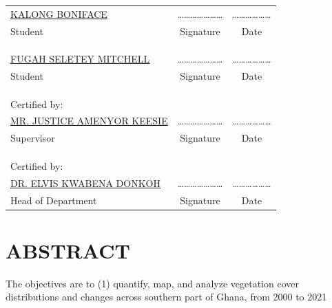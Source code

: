 \documentclass[12pt,a4paper]{book}
\begin{document}
	\begin{center}
	\begin{tabular}{lcc}
		\underline{KALONG BONIFACE} &\quad\quad\quad \ldots\ldots\ldots\ldots\ldots\ldots\ldots &\quad\quad\quad \ldots\ldots\ldots\ldots\ldots\ldots \\
		Student &\quad\quad\quad Signature &\quad\quad\quad Date \\
		& & \\
		& & \\
		& & \\
		\underline{FUGAH SELETEY MITCHELL} &\quad\quad\quad \ldots\ldots\ldots\ldots\ldots\ldots\ldots &\quad\quad\quad \ldots\ldots\ldots\ldots\ldots\ldots \\
		Student &\quad\quad\quad Signature &\quad\quad\quad Date \\
		& & \\
		& & \\
		& & \\
		Certified by: & &\\
		\underline{MR. JUSTICE AMENYOR KEESIE} &\quad\quad\quad \ldots\ldots\ldots\ldots\ldots\ldots\ldots &\quad\quad\quad \ldots\ldots\ldots\ldots\ldots\ldots \\
		Supervisor &\quad\quad\quad Signature &\quad\quad\quad Date \\
		& & \\
		& & \\
		& & \\
		Certified by: & &\\
		\underline{DR. ELVIS KWABENA DONKOH} &\quad\quad\quad \ldots\ldots\ldots\ldots\ldots\ldots\ldots &\quad\quad\quad \ldots\ldots\ldots\ldots\ldots\ldots \\
		Head of Department &\quad\quad\quad Signature &\quad\quad\quad Date
	\end{tabular}
\end{center}
	
	
	\newpage
	\section*{\textbf{ABSTRACT}}
	
	The objectives are to (1) quantify, map, and analyze vegetation cover distributions and changes across southern part of Ghana, from 2000 to 2021
	
\end{document}
